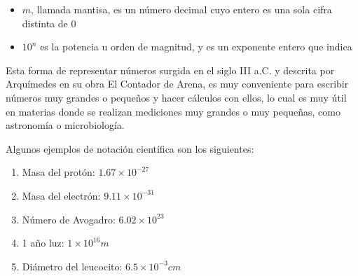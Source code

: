 \begin{itemize}
    \item $m$, llamada mantisa, es un número decimal cuyo entero es una sola cifra distinta de 0
    \item $10^{n}$ es la potencia u orden de magnitud, y es un exponente entero que indica 
\end{itemize}

Esta forma de representar números surgida en el siglo III a.C. y descrita por Arquímedes en su obra El Contador de Arena, es muy conveniente para escribir números muy grandes o pequeños y hacer cálculos con ellos, lo cual es muy útil en materias donde se realizan mediciones muy grandes o muy pequeñas, como astronomía o microbiología.

Algunos ejemplos de notación científica son los siguientes:

\begin{enumerate}
    \item Masa del protón: $1.67 \times 10^{-27}$
    \item Masa del electrón: $9.11 \times 10^{-31}$
    \item Número de Avogadro: $6.02 \times 10^{23}$
    \item 1 año luz: $1 \times 10^{16}m$
    \item Diámetro del leucocito: $6.5 \times 10^{-3}cm$
\end{enumerate}

\section{}



\section{}

